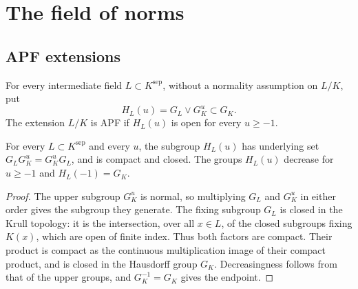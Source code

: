 \chapter{The field of norms}

\section{APF extensions}

\begin{definition}
\label{fw:apf-openness}
\leanok
For every intermediate field $L\subset K^{\mathrm{sep}}$, without a normality
assumption on $L/K$, put
\[
 H_L(u)=G_L\vee G_K^u\subset G_K.
\]
The extension $L/K$ is APF if $H_L(u)$ is open for every $u\geq-1$.
\end{definition}

\begin{lemma}
\label{fw:apf-products}
\leanok
For every $L\subset K^{\mathrm{sep}}$ and every $u$, the subgroup $H_L(u)$
has underlying set $G_LG_K^u=G_K^uG_L$, and is compact and closed.
The groups $H_L(u)$ decrease for $u\geq-1$ and $H_L(-1)=G_K$.
\end{lemma}
\begin{proof}
The upper subgroup $G_K^u$ is normal, so multiplying $G_L$ and $G_K^u$
in either order gives the subgroup they generate. The fixing subgroup
$G_L$ is closed in the Krull topology: it is the intersection, over all
$x\in L$, of the closed subgroups fixing $K(x)$, which are open of
finite index. Thus both factors are compact. Their product is compact
as the continuous multiplication image of their compact product, and
is closed in the Hausdorff group $G_K$. Decreasingness follows from
that of the upper groups, and $G_K^{-1}=G_K$ gives the endpoint.
\end{proof}

